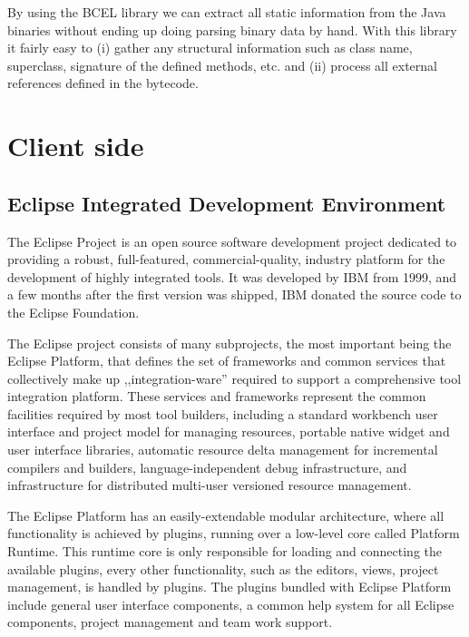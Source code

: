 By using the BCEL library we can extract all static information from the Java binaries without
ending up doing parsing binary data by hand. With this library it fairly easy to
(i) gather any structural information such as class name, superclass, signature
of the defined methods, etc. and (ii) process all external references defined in the 
bytecode.


\section{Client side}\label{sect:clientside}

\subsection{Eclipse Integrated Development Environment~\cite{Eclipseproject}}
The Eclipse Project is an open source software development
project dedicated to providing a robust, full-featured, commercial-quality,
industry platform for the development of highly integrated tools. It was
developed by IBM from 1999, and a few months after the first version was
shipped, IBM donated the source code to the Eclipse Foundation.

The Eclipse project consists of many subprojects, the most important being the
Eclipse Platform, that defines the set of frameworks and common services that
collectively make up ,,integ\-ration-ware'' required to support a comprehensive
tool integration platform. These services and frameworks represent the common
facilities required by most tool builders, including a standard workbench user
interface and project model for managing resources, portable native widget and
user interface libraries, automatic resource delta management for incremental
compilers and builders, language-independent debug infrastructure, and
infrastructure for distributed multi-user versioned resource management.

The Eclipse Platform has an easily-extendable modular architecture, where all
functionality is achieved by plugins, running over a low-level core called
Platform Runtime. This runtime core is only responsible for loading and
connecting the available plugins, every other functionality, such as the
editors, views, project management, is handled by plugins. The plugins bundled
with Eclipse Platform include general user interface components, a common help
system for all Eclipse components, project management and team work support.

